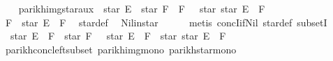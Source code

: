 \begin{isabellebody}
\ \ \isamarkupfalse%
\isanewline
{}\isamarkupfalse%
%
\endisatagproof
{\isafoldproof}%
%
\isadelimproof
\isanewline
%
\endisadelimproof
\isanewline
{}\isamarkupfalse%
\ parikh{\isacharunderscore}{\kern0pt}img{\isacharunderscore}{\kern0pt}star{}{\isacharunderscore}{\kern0pt}aux{}{\isacharcolon}{\kern0pt}\ {\isachardoublequoteopen}{\isasymPsi}\ {\isacharparenleft}{\kern0pt}star\ E\ {\isacharat}{\kern0pt}{\isacharat}{\kern0pt}\ star\ F\ {\isacharat}{\kern0pt}{\isacharat}{\kern0pt}\ F{\isacharparenright}{\kern0pt}\ {\isasymsubseteq}\ {\isasymPsi}\ {\isacharparenleft}{\kern0pt}star\ {\isacharparenleft}{\kern0pt}star\ E\ {\isacharat}{\kern0pt}{\isacharat}{\kern0pt}\ F{\isacharparenright}{\kern0pt}{\isacharparenright}{\kern0pt}{\isachardoublequoteclose}\isanewline
%
\isadelimproof
%
\endisadelimproof
%
\isatagproof
{}\isamarkupfalse%
\ {\isacharminus}{\kern0pt}\isanewline
\ \ \isamarkupfalse%
\ {\isachardoublequoteopen}F\ {\isasymsubseteq}\ star\ E\ {\isacharat}{\kern0pt}{\isacharat}{\kern0pt}\ F{\isachardoublequoteclose}\ \isamarkupfalse%
\ star{\isacharunderscore}{\kern0pt}def\ \isamarkupfalse%
\ Nil{\isacharunderscore}{\kern0pt}in{\isacharunderscore}{\kern0pt}star\isanewline
\ \ \ \ \isamarkupfalse%
\ {\isacharparenleft}{\kern0pt}metis\ concI{\isacharunderscore}{\kern0pt}if{\isacharunderscore}{\kern0pt}Nil{}\ star{\isacharunderscore}{\kern0pt}def\ subsetI{\isacharparenright}{\kern0pt}\isanewline
\ \ \isamarkupfalse%
\ \isamarkupfalse%
\ {\isachardoublequoteopen}{\isasymPsi}\ {\isacharparenleft}{\kern0pt}star\ E\ {\isacharat}{\kern0pt}{\isacharat}{\kern0pt}\ F\ {\isacharat}{\kern0pt}{\isacharat}{\kern0pt}\ star\ F{\isacharparenright}{\kern0pt}\ {\isasymsubseteq}\ {\isasymPsi}\ {\isacharparenleft}{\kern0pt}star\ E\ {\isacharat}{\kern0pt}{\isacharat}{\kern0pt}\ F\ {\isacharat}{\kern0pt}{\isacharat}{\kern0pt}\ star\ {\isacharparenleft}{\kern0pt}star\ E\ {\isacharat}{\kern0pt}{\isacharat}{\kern0pt}\ F{\isacharparenright}{\kern0pt}{\isacharparenright}{\kern0pt}{\isachardoublequoteclose}\isanewline
\ \ \ \ \isamarkupfalse%
\ parikh{\isacharunderscore}{\kern0pt}conc{\isacharunderscore}{\kern0pt}left{\isacharunderscore}{\kern0pt}subset\ parikh{\isacharunderscore}{\kern0pt}img{\isacharunderscore}{\kern0pt}mono\ parikh{\isacharunderscore}{\kern0pt}star{\isacharunderscore}{\kern0pt}mono\ \isamarkupfalse%

\end{isabellebody}
